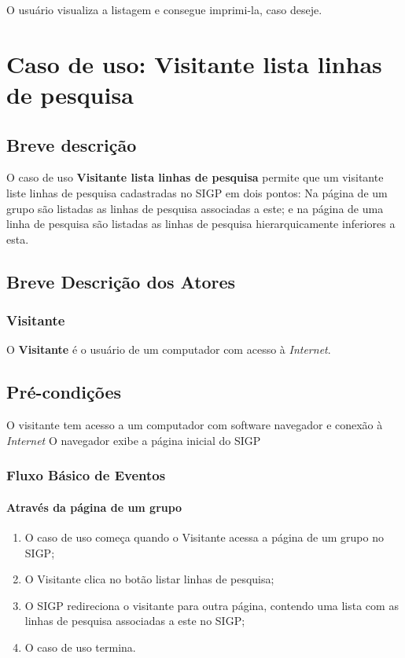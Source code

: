 \documentclass[11pt, a4paper,oneside]{book}
\begin{document}
O usuário visualiza a listagem e consegue imprimi-la, caso deseje.

%

\chapter[Caso de Uso]{Caso de uso: \bf Visitante lista linhas de pesquisa}
\label{cap:casodeuso}	

\section{Breve descrição}

O caso de uso \textbf{Visitante lista linhas de pesquisa} permite que um visitante liste linhas de pesquisa cadastradas no SIGP em dois pontos: Na página de um grupo são listadas as linhas de pesquisa associadas a este; e na página de uma linha de pesquisa são listadas as linhas de pesquisa hierarquicamente inferiores a esta.

\section{Breve Descrição dos Atores}

\subsection{Visitante}

O \textbf{Visitante} é o usuário de um computador com acesso à \emph{Internet}.

\section{Pré-condições}
O visitante tem acesso a um computador com software navegador e conexão à \emph{Internet}
O navegador exibe a página inicial do SIGP

\subsection{Fluxo Básico de Eventos}

\subsubsection{Através da página de um grupo}
\begin{enumerate}
\item O caso de uso começa quando o Visitante acessa a página de um grupo no SIGP;
\item O Visitante clica no botão listar linhas de pesquisa;
\item O SIGP redireciona o visitante para outra página, contendo uma lista com as linhas de pesquisa associadas a este no SIGP;
\item O caso de uso termina.
\end{enumerate}
\end{document}
